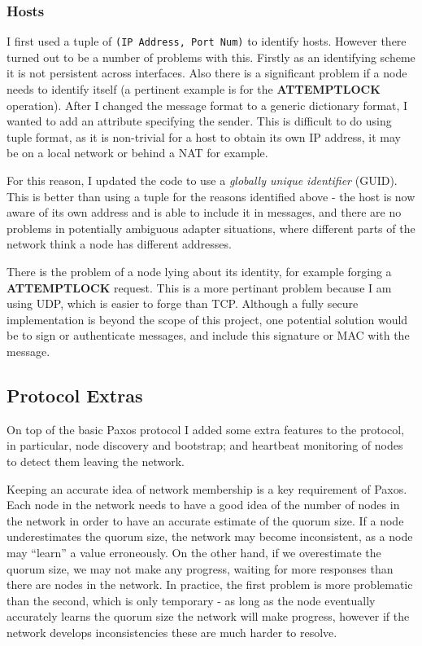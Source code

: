 \documentclass[12pt,twoside,notitlepage]{report}
\newcommand{\op}[1]  {{\bf #1}}         %
\begin{document}
\subsubsection*{Hosts}

I first used a tuple of \verb+(IP Address, Port Num)+ to identify hosts. However there turned out
to be a number of problems with this. Firstly as an identifying scheme it is not persistent across
interfaces. Also there is a significant problem if a node needs to identify itself (a pertinent
example is for the \op{ATTEMPTLOCK} operation). After I changed the message format to a generic
dictionary format, I wanted to add an attribute specifying the sender. This is difficult to do
using tuple format, as it is non-trivial for a host to obtain its own IP address, it may be on a
local network or behind a NAT for example.

For this reason, I updated the code to use a \emph{globally unique identifier} (GUID). This is
better than using a tuple for the reasons identified above - the host is now aware of its own
address and is able to include it in messages, and there are no problems in potentially ambiguous
adapter situations, where different parts of the network think a node has different addresses.

There is the problem of a node lying about its identity, for example forging a \op{ATTEMPTLOCK}
request. This is a more pertinant problem because I am using UDP, which is easier to forge than
TCP. Although a fully secure implementation is beyond the scope of this project, one potential
solution would be to sign or authenticate messages, and include this signature or MAC with the
message.


\subsection{Protocol Extras}

On top of the basic Paxos protocol I added some extra features to the protocol, in particular,
node discovery and bootstrap; and heartbeat monitoring of nodes to detect them leaving the
network.

Keeping an accurate idea of network membership is a key requirement of Paxos. Each node in the
network needs to have a good idea of the number of nodes in the network in order to have an
accurate estimate of the quorum size. If a node underestimates the quorum size, the network may
become inconsistent, as a node may ``learn'' a value erroneously. On the other hand, if we
overestimate the quorum size, we may not make any progress, waiting for more responses than there
are nodes in the network. In practice, the first problem is more problematic than the second,
which is only temporary - as long as the node eventually accurately learns the quorum size the
network will make progress, however if the network develops inconsistencies these are much harder
to resolve.
\end{document}
